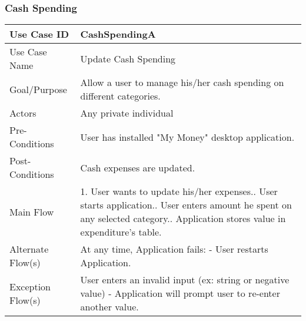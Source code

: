 \documentclass[12pt]{article}
\begin{document}
\subsubsection{Cash Spending} \label{uc:2}

\begin{center}
\begin{tabular}{| p{5cm} | p{10cm} |}
\hline

Use Case ID  & CashSpendingA\\
\hline
Use Case Name  & Update Cash Spending\\
\hline
Goal/Purpose  & Allow a user to manage his/her cash spending on different categories.\\
\hline
Actors  & Any private individual \\
\hline
Pre-Conditions &  User has installed "My Money" desktop application. \\
\hline
Post-Conditions & Cash expenses are updated.  \\
\hline
Main Flow & 
1. User wants to update his/her expenses.\newline 
2. User starts application.\newline
3. User enters amount he spent on any selected category.\newline
4. Application stores value in expenditure's table. 
\\
\hline
Alternate Flow(s) & 
At any time, Application fails: \newline
   - User restarts Application.
\\
\hline
Exception Flow(s) & User enters an invalid input (ex: string or negative value) \newline
- Application will prompt user to re-enter another value.\\
\hline

\end{tabular}
\end{center}
\end{document}
